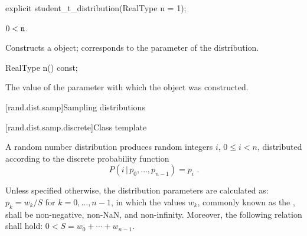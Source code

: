 %
\begin{itemdecl}
explicit student_t_distribution(RealType n = 1);
\end{itemdecl}

\begin{itemdescr}
\pnum
\requires $0 < \texttt{n}$.

\pnum
\effects Constructs a  object;
 corresponds to the parameter of the distribution.
\end{itemdescr}

%
\begin{itemdecl}
RealType n() const;
\end{itemdecl}

\begin{itemdescr}
\pnum\returns The value of the  parameter
 with which the object was constructed.
\end{itemdescr}%
%



[rand.dist.samp]{Sampling distributions}%
%



[rand.dist.samp.discrete]{Class template }%
%
%

\pnum
A  random number distribution
produces random integers $i$, $0 \leq i < n$,
distributed according to
the discrete probability function%
%
%
\[  P(i \,|\, p_0, \dotsc, p_{n-1}) = p_i \text{ .} \]

\pnum
Unless specified otherwise,
the distribution parameters are calculated as:
$p_k = {w_k / S}$ for $k = 0, \dotsc, n - 1$,
in which the values $w_k$,
commonly known as the %
%
%
, shall be non-negative, non-NaN, and non-infinity.
Moreover, the following relation shall hold:
$0 < S = w_0 + \dotsb + w_{n - 1}$.

